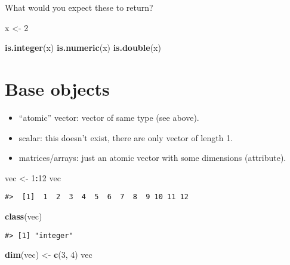\documentclass[]{book}
\newenvironment{Shaded}{\begin{snugshade}}{\end{snugshade}}
\newcommand{\KeywordTok}[1]{\textcolor[rgb]{0.13,0.29,0.53}{\textbf{#1}}}
\newcommand{\DecValTok}[1]{\textcolor[rgb]{0.00,0.00,0.81}{#1}}
\newcommand{\StringTok}[1]{\textcolor[rgb]{0.31,0.60,0.02}{#1}}
\newcommand{\OperatorTok}[1]{\textcolor[rgb]{0.81,0.36,0.00}{\textbf{#1}}}
\newcommand{\NormalTok}[1]{#1}
\theoremstyle{definition}
\theoremstyle{definition}
\theoremstyle{definition}
\theoremstyle{remark}
\begin{document}
What would you expect these to return?

\begin{Shaded}
\begin{Highlighting}[]
\NormalTok{x <-}\StringTok{ }\DecValTok{2}

\KeywordTok{is.integer}\NormalTok{(x)}
\KeywordTok{is.numeric}\NormalTok{(x)}
\KeywordTok{is.double}\NormalTok{(x)}
\end{Highlighting}
\end{Shaded}

\section{Base objects}\label{base-objects}

\begin{itemize}
\item
  ``atomic'' vector: vector of same type (see above).
\item
  scalar: this doesn't exist, there are only vector of length 1.
\item
  matrices/arrays: just an atomic vector with some dimensions
  (attribute).
\end{itemize}

\begin{Shaded}
\begin{Highlighting}[]
\NormalTok{vec <-}\StringTok{ }\DecValTok{1}\OperatorTok{:}\DecValTok{12}
\NormalTok{vec}
\end{Highlighting}
\end{Shaded}

\begin{verbatim}
#>  [1]  1  2  3  4  5  6  7  8  9 10 11 12
\end{verbatim}

\begin{Shaded}
\begin{Highlighting}[]
\KeywordTok{class}\NormalTok{(vec)}
\end{Highlighting}
\end{Shaded}

\begin{verbatim}
#> [1] "integer"
\end{verbatim}

\begin{Shaded}
\begin{Highlighting}[]
\KeywordTok{dim}\NormalTok{(vec) <-}\StringTok{ }\KeywordTok{c}\NormalTok{(}\DecValTok{3}\NormalTok{, }\DecValTok{4}\NormalTok{)}
\NormalTok{vec}
\end{Highlighting}
\end{Shaded}
\end{document}

